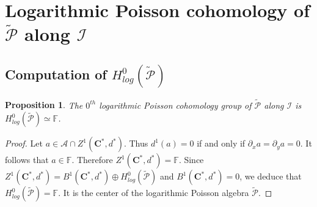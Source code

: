 \documentclass[a4paper, 12pt,oneside,reqno]{amsart}
\newtheorem{proposition}[theorem]{Proposition}
\theoremstyle{definition}
\begin{document}
\section{Logarithmic Poisson cohomology of $\tilde{\mathcal{P}}$ along $\mathcal{I}$}
             \subsection{Computation of $H_{log}^{0}(\tilde{\mathcal{P}})$}
             \begin{proposition} The  $0^{th}$  logarithmic Poisson cohomology group of $\tilde{\mathcal{P}}$ along $\mathcal{I}$ is
             $H_{log}^{0}(\tilde{\mathcal{P}}) \simeq \mathbb{F}$.
             \end{proposition}            
\begin{proof}
Let $a\in \mathcal{A}\cap Z^{1}(\textbf{C}^{*},d^{*})$. Thus $d^{1}(a)=0$ if and only if $\partial_{x}a=\partial_{y}a=0$. It follows that $a\in \mathbb{F}$.  Therefore $Z^{1}(\textbf{C}^{*},d^{*})=\mathbb{F}$. Since $Z^{1}(\textbf{C}^{*},d^{*})= B^{1}(\textbf{C}^{*},d^{*})\oplus H_{log}^{0}(\tilde{\mathcal{P}})$ and $B^{1}(\textbf{C}^{*},d^{*})=0$, we deduce that $H_{log}^{0}(\tilde{\mathcal{P}})=\mathbb{F}$. It is the center of the logarithmic Poisson algebra $\tilde{\mathcal{P}}$.
\end{proof}
\end{document}
